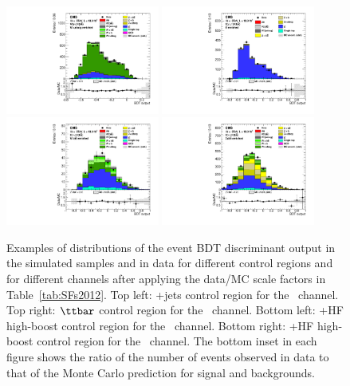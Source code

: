 \documentclass[11pt,twoside,a4paper,cmspaper,final,collab]{cms-tdr}
\begin{document}
\begin{figure}[tbh]
 \begin{center}
   \includegraphics[width=0.45\textwidth]{WudscgBDTWen_BDTWen_VH_unweighted}
    \includegraphics[width=0.45\textwidth]{TTbarBDTZmm_BDTZmm_VH_unweighted}
    \includegraphics[width=0.45\textwidth]{WbbBDTZnn_BDTZnn_VH_unweighted}
    \includegraphics[width=0.45\textwidth]{ZbbBDTZnn_BDTZnn_VH_unweighted}
    \caption{Examples of distributions of the event BDT discriminant output in the simulated
      samples and in data for different control regions and for different channels after applying the
      data/MC scale factors in Table~\ref{tab:SFs2012}. Top left:
      \PW+jets control region for the \WenH\ channel. Top
        right: $\ttbar$ control region for
      the \ZmmH\ channel. Bottom left: \PW+HF high-boost control region for the \ZnnH\
      channel. Bottom right: \cPZ+HF
      high-boost control region for the \ZnnH\ channel. The bottom inset in each
      figure shows the ratio of the number of events observed in data to that
      of the Monte Carlo prediction for signal and backgrounds.
    }
    \label{fig:control_regions_BDT}
  \end{center}
\end{figure}
\end{document}
